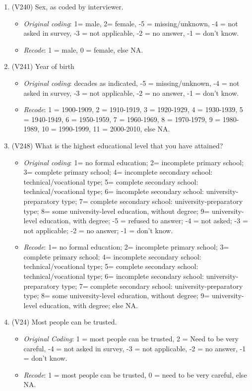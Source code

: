 \documentclass[]{article}
\begin{document}
\begin{enumerate}
  \item (V240) Sex, as coded by interviewer.
  \begin{itemize}
  \item \textit{Original coding}: 1= male, 2= female, -5 = missing/unknown, -4 = not asked in survey, -3 = not applicable, -2 = no answer, -1 = don't know. 
  \item \textit{Recode}: 1 = male, 0 = female, else NA.
  \end{itemize}
  \item (V241) Year of birth
  \begin{itemize}
  \item \textit{Original coding}: decades as indicated, -5 = missing/unknown, -4 = not asked in survey, -3 = not applicable, -2 = no answer, -1 = don't know.
  \item \textit{Recode}: 1 = 1900-1909, 2 = 1910-1919, 3 = 1920-1929, 4 = 1930-1939, 5 = 1940-1949, 6 = 1950-1959, 7 = 1960-1969, 8 = 1970-1979, 9 = 1980-1989, 10 = 1990-1999, 11 = 2000-2010, else NA.
  \end{itemize}
  \item (V248) What is the highest educational level that you have attained?
  \begin{itemize}
  \item \textit{Original coding}: 1= no formal education; 2= incomplete primary school; 3= complete primary school; 4= incomplete secondary school: technical/vocational type; 5= complete secondary school: technical/vocational type; 6= incomplete secondary school: university-preparatory type; 7= complete secondary school: university-preparatory type; 8= some university-level education, without degree; 9= university-level education, with degree; -5 = refused to answer; -4 = not asked; -3 = not applicable; -2 = no answer; -1 = don't know.
  \item \textit{Recode}: 1= no formal education; 2= incomplete primary school; 3= complete primary school; 4= incomplete secondary school: technical/vocational type; 5= complete secondary school: technical/vocational type; 6= incomplete secondary school: university-preparatory type; 7= complete secondary school: university-preparatory type; 8= some university-level education, without degree; 9= university-level education, with degree; else NA.
  \end{itemize}
  \item (V24) Most people can be trusted.
  \begin{itemize}
  \item \textit{Original Coding}: 1 = most people can be trusted, 2 = Need to be very careful, -4 = not asked in survey, -3 = not applicable, -2 = no answer, -1 = don't know.
  \item \textit{Recode}: 1 = most people can be trusted, 0 = need to be very careful, else NA.
  \end{itemize}
\end{enumerate}
\end{document}

